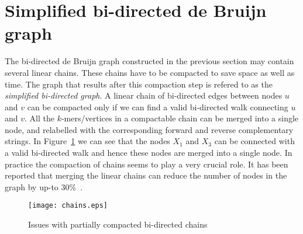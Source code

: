 \documentclass[11pt,conference,twocolumn]{IEEEtran}
\begin{document}
\section{Simplified bi-directed de Bruijn graph}
\label{sec:simplification}
The bi-directed de Bruijn graph constructed in the previous section may contain several linear 
chains. These chains have to be compacted to save space as well as time. The graph that results
after this compaction step is refered to as
the {\em simplified bi-directed graph}. A linear chain of bi-directed edges between nodes 
$u$ and $v$ can be compacted only if we can find a valid bi-directed walk connecting $u$ and $v$. 
All the $k$-mers/vertices in a compactable chain can be 
merged into a single node, and relabelled with the corresponding forward and reverse complementary strings. 
In Figure~\ref{fig:chains} we can see that the nodes $X_1$ and $X_3$ can be connected with a valid bi-directed 
walk and hence these nodes are merged into a single node. In practice the compaction of chains seems
to play a very crucial role. It has been reported that merging the linear chains can 
reduce the number of nodes in the graph by up-to $30\%$~\cite{velvet08}. 

\begin{figure}
\begin{center}
\texttt{[image: chains.eps]}
\end{center}
\caption{Issues with partially compacted bi-directed chains}
\label{fig:chains}
\end{figure}
\end{document}
